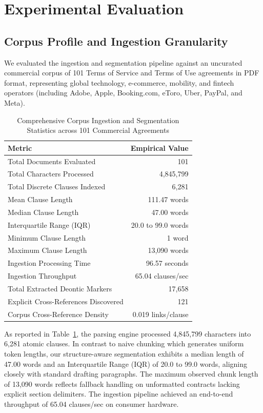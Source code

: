 \documentclass[conference]{IEEEtran}
\begin{document}
\section{Experimental Evaluation}

\subsection{Corpus Profile and Ingestion Granularity}
We evaluated the ingestion and segmentation pipeline against an uncurated commercial corpus of 101 Terms of Service and Terms of Use agreements in PDF format, representing global technology, e-commerce, mobility, and fintech operators (including Adobe, Apple, Booking.com, eToro, Uber, PayPal, and Meta). 

\begin{table}[t]
\caption{Comprehensive Corpus Ingestion and Segmentation Statistics across 101 Commercial Agreements}
\label{tab:corpus_breakdown}
\centering
\begin{tabular}{lr}
\toprule
\textbf{Metric} & \textbf{Empirical Value} \\
\midrule
Total Documents Evaluated & 101 \\
Total Characters Processed & 4,845,799 \\
Total Discrete Clauses Indexed & 6,281 \\
Mean Clause Length & 111.47 words \\
Median Clause Length & 47.00 words \\
Interquartile Range (IQR) & 20.0 to 99.0 words \\
Minimum Clause Length & 1 word \\
Maximum Clause Length & 13,090 words \\
Ingestion Processing Time & 96.57 seconds \\
Ingestion Throughput & 65.04 clauses/sec \\
Total Extracted Deontic Markers & 17,658 \\
Explicit Cross-References Discovered & 121 \\
Corpus Cross-Reference Density & 0.019 links/clause \\
\bottomrule
\end{tabular}
\end{table}

As reported in Table~\ref{tab:corpus_breakdown}, the parsing engine processed 4,845,799 characters into 6,281 atomic clauses. In contrast to naive chunking which generates uniform token lengths, our structure-aware segmentation exhibits a median length of 47.00 words and an Interquartile Range (IQR) of 20.0 to 99.0 words, aligning closely with standard drafting paragraphs. The maximum observed chunk length of 13,090 words reflects fallback handling on unformatted contracts lacking explicit section delimiters. The ingestion pipeline achieved an end-to-end throughput of 65.04 clauses/sec on consumer hardware.
\end{document}
